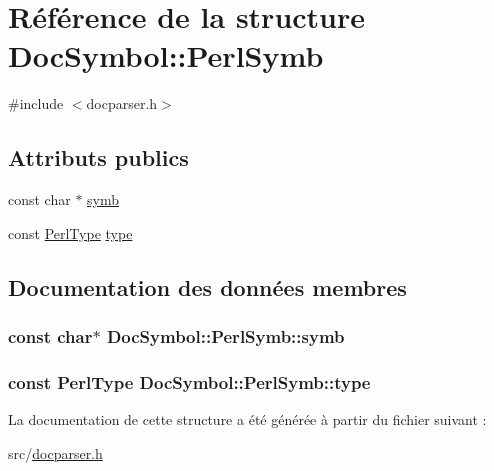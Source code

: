 \hypertarget{struct_doc_symbol_1_1_perl_symb}{}\section{Référence de la structure Doc\+Symbol\+:\+:Perl\+Symb}
\label{struct_doc_symbol_1_1_perl_symb}


{\ttfamily \#include $<$docparser.\+h$>$}

\subsection*{Attributs publics}
\begin{DoxyCompactItemize}
\item 
const char $\ast$ \hyperlink{struct_doc_symbol_1_1_perl_symb_a204d1b219a9e60b0221d0c4a480c2846}{symb}
\item 
const \hyperlink{class_doc_symbol_a513eebcda007c5999064ab5de1d1e847}{Perl\+Type} \hyperlink{struct_doc_symbol_1_1_perl_symb_a31739403a369f6ead5d501ad8ecfdf91}{type}
\end{DoxyCompactItemize}


\subsection{Documentation des données membres}
\hypertarget{struct_doc_symbol_1_1_perl_symb_a204d1b219a9e60b0221d0c4a480c2846}{}
\subsubsection[{symb}]{\setlength{\rightskip}{0pt plus 5cm}const char$\ast$ Doc\+Symbol\+::\+Perl\+Symb\+::symb}\label{struct_doc_symbol_1_1_perl_symb_a204d1b219a9e60b0221d0c4a480c2846}
\hypertarget{struct_doc_symbol_1_1_perl_symb_a31739403a369f6ead5d501ad8ecfdf91}{}
\subsubsection[{type}]{\setlength{\rightskip}{0pt plus 5cm}const {\bf Perl\+Type} Doc\+Symbol\+::\+Perl\+Symb\+::type}\label{struct_doc_symbol_1_1_perl_symb_a31739403a369f6ead5d501ad8ecfdf91}


La documentation de cette structure a été générée à partir du fichier suivant \+:\begin{DoxyCompactItemize}
\item 
src/\hyperlink{docparser_8h}{docparser.\+h}\end{DoxyCompactItemize}
